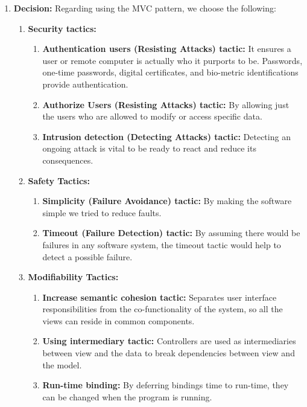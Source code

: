 \documentclass[a4paper,12pt]{report}
\begin{document}
\begin{enumerate}
    \item \textbf{Decision:} Regarding using the MVC pattern, we choose the following:
    
    \begin{enumerate}
        \item \textbf{Security tactics:}
        \begin{enumerate}
            \item \textbf{Authentication users (Resisting Attacks) tactic:} It ensures a user or remote computer is actually who it purports to be. Passwords, one-time passwords, digital certificates, and bio-metric identifications provide authentication.
            
            \item \textbf{Authorize Users (Resisting Attacks) tactic:} By allowing just the users who are allowed to modify or access specific data.
            
            \item \textbf{Intrusion detection (Detecting Attacks) tactic:} Detecting an ongoing attack is vital to be ready to react and reduce its consequences.
        \end{enumerate}
    
        \item \textbf{Safety Tactics:}
        \begin{enumerate}
            \item \textbf{Simplicity (Failure Avoidance) tactic:} By making the software simple we tried to reduce faults.
            \item \textbf{Timeout (Failure Detection) tactic:} By assuming there would be failures in any software system, the timeout tactic would help to detect a possible failure.
        \end{enumerate}
        
        \item \textbf{Modifiability Tactics:}
        \begin{enumerate}
            \item \textbf{Increase semantic cohesion tactic:} Separates user interface responsibilities from the co-functionality of the system, so all the views can reside in common components.
            \item \textbf{Using intermediary tactic:} Controllers are used as intermediaries between view and the data to break dependencies between view and the model.
            \item \textbf{Run-time binding:} By deferring bindings time to run-time, they can be changed when the program is running.
        \end{enumerate}
    \end{enumerate}
\end{enumerate}
\end{document}
